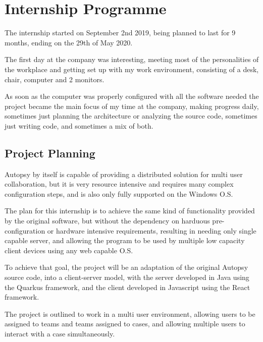 



\chapter{Internship Programme}
\label{ch:development}

The internship started on September 2nd 2019, being planned to last for 9 months, ending on the 29th of May 2020.

The first day at the company was interesting, meeting most of the personalities of the workplace and getting set up with my work environment,
consisting of a desk, chair, computer and 2 monitors.

As soon as the computer was properly configured with all the software needed the project became the main focus of my time at the company,
making progress daily, sometimes just planning the architecture or analyzing the source code, sometimes just writing code, and sometimes a mix of both.

\section{Project Planning}

Autopsy by itself is capable of providing a distributed solution for multi user collaboration, but it is very resource intensive and requires many complex configuration steps,
and is also only fully supported on the Windows O.S.

The plan for this internship is to achieve the same kind of functionality provided by the original software, but without the dependency on harduous pre-configuration
or hardware intensive requirements, resulting in needing only single capable server, and allowing the program to be used by multiple low capacity client devices using 
any web capable O.S.

To achieve that goal, the project will be an adaptation of the original Autopsy source code, into a client-server model, with the server developed in Java using the Quarkus framework,
and the client developed in Javascript using the React framework.

The project is outlined to work in a multi user environment, allowing users to be assigned to teams and teams assigned to cases, and allowing multiple users to interact with
a case simultaneously.

